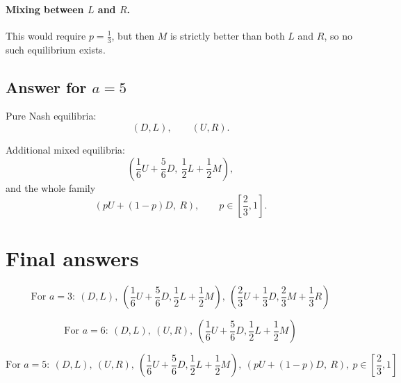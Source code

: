 \paragraph{Mixing between \(L\) and \(R\).}
This would require \(p=\frac13\), but then \(M\) is strictly better than both \(L\) and \(R\), so no such equilibrium exists.

\subsection*{Answer for \(a=5\)}

Pure Nash equilibria:
\[
(D,L),\qquad (U,R).
\]

Additional mixed equilibria:
\[
\left(\frac16 U+\frac56 D,\ \frac12 L+\frac12 M\right),
\]
and the whole family
\[
\left(pU+(1-p)D,\ R\right),
\qquad
p\in\left[\frac23,1\right].
\]

\section*{Final answers}

\[
\text{For }a=3: \ (D,L),\ \left(\frac16 U+\frac56 D,\frac12 L+\frac12 M\right),\ \left(\frac23 U+\frac13 D,\frac23 M+\frac13 R\right)
\]

\[
\text{For }a=6: \ (D,L),\ (U,R),\ \left(\frac16 U+\frac56 D,\frac12 L+\frac12 M\right)
\]

\[
\text{For }a=5: \ (D,L),\ (U,R),\ \left(\frac16 U+\frac56 D,\frac12 L+\frac12 M\right),\ \left(pU+(1-p)D,\ R\right),\ p\in\left[\frac23,1\right]
\]
